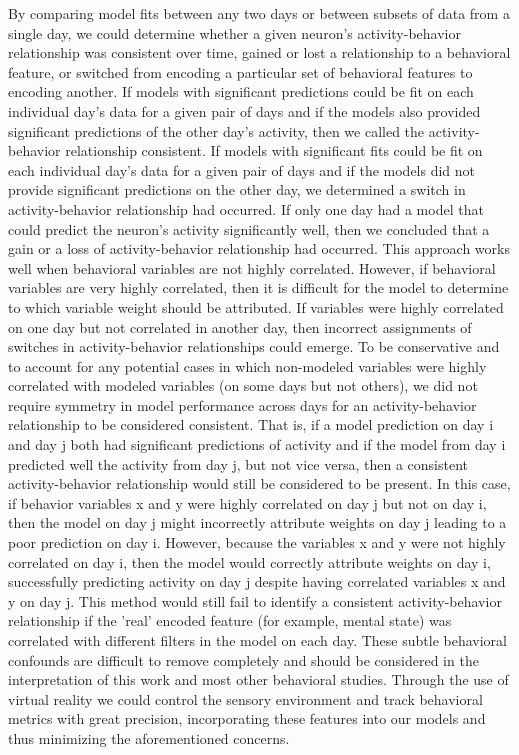 By comparing model fits between any two days or between subsets of data from a single day, we could determine whether a given neuron's activity-behavior relationship was consistent over time, gained or lost a relationship to a behavioral feature, or switched from encoding a particular set of behavioral features to encoding another. If models with significant predictions could be fit on each individual day's data for a given pair of days and if the models also provided significant predictions of the other day's activity, then we called the activity-behavior relationship consistent. If models with significant fits could be fit on each individual day's data for a given pair of days and if the models did not provide significant predictions on the other day, we determined a switch in activity-behavior relationship had occurred. If only one day had a model that could predict the neuron's activity significantly well, then we concluded that a gain or a loss of activity-behavior relationship had occurred. This approach works well when behavioral variables are not highly correlated. However, if behavioral variables are very highly correlated, then it is difficult for the model to determine to which variable weight should be attributed. If variables were highly correlated on one day but not correlated in another day, then incorrect assignments of switches in activity-behavior relationships could emerge. To be conservative and to account for any potential cases in which non-modeled variables were highly correlated with modeled variables (on some days but not others), we did not require symmetry in model performance across days for an activity-behavior relationship to be considered consistent. That is, if a model prediction on day i and day j both had significant predictions of activity and if the model from day i predicted well the activity from day j, but not vice versa, then a consistent activity-behavior relationship would still be considered to be present. In this case, if behavior variables x and y were highly correlated on day j but not on day i, then the model on day j might incorrectly attribute weights on day j leading to a poor prediction on day i. However, because the variables x and y were not highly correlated on day i, then the model would correctly attribute weights on day i, successfully predicting activity on day j despite having correlated variables x and y on day j. This method would still fail to identify a consistent activity-behavior relationship if the 'real' encoded feature (for example, mental state) was correlated with different filters in the model on each day. These subtle behavioral confounds are difficult to remove completely and should be considered in the interpretation of this work and most other behavioral studies. Through the use of virtual reality we could control the sensory environment and track behavioral metrics with great precision, incorporating these features into our models and thus minimizing the aforementioned concerns.

